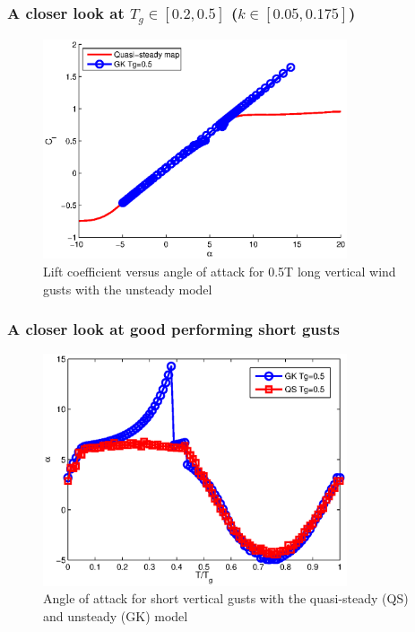\documentclass[compress]{beamer}
\begin{document}
\begin{frame}
  \frametitle{A closer look at $T_g \in [0.2,0.5]$ ($k \in [0.05,0.175]$)}
  \begin{figure}[h]
    \centering
    \includegraphics[width=0.8\textwidth]{./Figures/Cl_vs_alpha_wt=1_tg=0p5_alphamax=20.eps}
    \caption{Lift coefficient versus angle of attack for 0.5T long vertical wind gusts with the unsteady model}
  \end{figure}
\end{frame}

\begin{frame}
  \frametitle{A closer look at good performing short gusts}
  \begin{figure}[h]
    \centering
    \includegraphics[width=0.8\textwidth]{./Figures/alpha_vs_Tg_wt1.eps}
    \caption{Angle of attack for short vertical gusts with the quasi-steady (QS) and unsteady (GK) model}
  \end{figure}
\end{frame}
\end{document}
